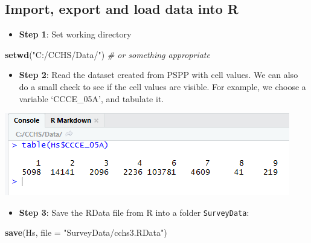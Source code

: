 \documentclass[
]{book}
\newenvironment{Shaded}{\begin{snugshade}}{\end{snugshade}}
\newcommand{\CommentTok}[1]{\textcolor[rgb]{0.56,0.35,0.01}{\textit{#1}}}
\newcommand{\DataTypeTok}[1]{\textcolor[rgb]{0.13,0.29,0.53}{#1}}
\newcommand{\KeywordTok}[1]{\textcolor[rgb]{0.13,0.29,0.53}{\textbf{#1}}}
\newcommand{\NormalTok}[1]{#1}
\newcommand{\OperatorTok}[1]{\textcolor[rgb]{0.81,0.36,0.00}{\textbf{#1}}}
\newcommand{\OtherTok}[1]{\textcolor[rgb]{0.56,0.35,0.01}{#1}}
\newcommand{\StringTok}[1]{\textcolor[rgb]{0.31,0.60,0.02}{#1}}
\providecommand{\tightlist}{%
  \setlength{\itemsep}{0pt}\setlength{\parskip}{0pt}}
\begin{document}
\hypertarget{import-export-and-load-data-into-r}{%
\subsection{Import, export and load data into R}\label{import-export-and-load-data-into-r}}

\begin{itemize}
\tightlist
\item
  \textbf{Step 1}: Set working directory
\end{itemize}

\begin{Shaded}
\begin{Highlighting}[]
\KeywordTok{setwd}\NormalTok{(}\StringTok{"C:/CCHS/Data/"}\NormalTok{) }\CommentTok{# or something appropriate}
\end{Highlighting}
\end{Shaded}

\begin{itemize}
\tightlist
\item
  \textbf{Step 2}: Read the dataset created from PSPP with cell values. We can also do a small check to see if the cell values are visible. For example, we choose a variable `CCCE\_05A', and tabulate it.
\end{itemize}

\begin{Shaded}
\end{Shaded}

\includegraphics[width=0.65\linewidth]{images/abacus46}

\begin{itemize}
\tightlist
\item
  \textbf{Step 3}: Save the RData file from R into a folder \texttt{SurveyData}:
\end{itemize}

\begin{Shaded}
\begin{Highlighting}[]
\KeywordTok{save}\NormalTok{(Hs, }\DataTypeTok{file =} \StringTok{"SurveyData/cchs3.RData"}\NormalTok{)}
\end{Highlighting}
\end{Shaded}
\end{document}
